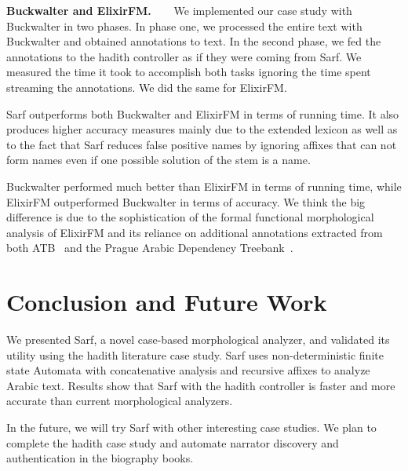\documentclass[11pt]{article}
\begin{document}
{\bf Buckwalter and ElixirFM.~~~}
We implemented our case study with Buckwalter in two phases. 
In phase one, we processed the entire text with Buckwalter and
obtained annotations to text. 
In the second phase, we fed the annotations to 
the hadith controller as if they were coming from Sarf. 
We measured the time it took to accomplish both tasks
ignoring the time spent streaming the annotations.
We did the same for ElixirFM. 

Sarf outperforms both Buckwalter and ElixirFM in terms of 
running time. 
It also produces higher accuracy measures 
mainly due to the extended
lexicon as well as to the fact that Sarf reduces false positive
names by ignoring affixes that can not form
names even if one possible solution of the stem is a name. 

Buckwalter performed much better than ElixirFM in 
terms of running time, 
while ElixirFM outperformed Buckwalter in terms of accuracy.
We think the big difference is due to the sophistication of 
the formal functional morphological analysis of ElixirFM 
and its reliance on additional annotations extracted from 
both ATB~\cite{Maamouri:04} and the Prague Arabic Dependency Treebank~\cite{Prague04}.

\section{Conclusion and Future Work}
\label{sec:future}

We presented Sarf, a novel case-based morphological analyzer,
and validated its utility using the hadith literature
case study. 
Sarf uses non-deterministic finite state Automata with 
concatenative analysis and recursive affixes to analyze 
Arabic text. 
Results show that Sarf with the hadith controller
is faster and more accurate than
current morphological analyzers.

In the future, 
we will try Sarf with other interesting case studies.
We plan to complete the hadith case study 
and automate narrator discovery and authentication in the 
biography books. 
\end{document}
